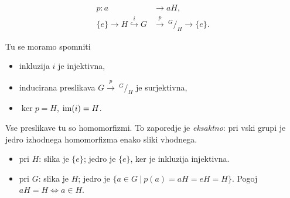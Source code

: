 \begin{align*}
	p : a &\longrightarrow aH, \\
	\{e\} \to H \stackrel{i}{\hookrightarrow} G &\stackrel{p}{\longrightarrow}\ ^G/_H \to \{e\}.
\end{align*}

\ni Tu se moramo spomniti
\begin{itemize}
	\item{inkluzija $i$ je injektivna,}
	\item{inducirana preslikava $G \stackrel{p}{\to}\ ^G/_H$ je surjektivna,}
	\item{$\ker p = H$, $\operatorname{im}(i) = H$.}
\end{itemize}

\ni Vse preslikave tu so homomorfizmi. To zaporedje je \emph{eksaktno}: pri vski grupi je jedro izhodnega
homomorfizma enako sliki vhodnega.
\begin{itemize}
	\item{pri $H$: slika je $\{e\}$; jedro je $\{e\}$, ker je inkluzija injektivna.}
	\item{pri $G$: slika je $H$; jedro je $\{a \in G\ |\ p(a) = aH = eH = H\}$. Pogoj $aH = H \iff a \in H$.}
\end{itemize}
